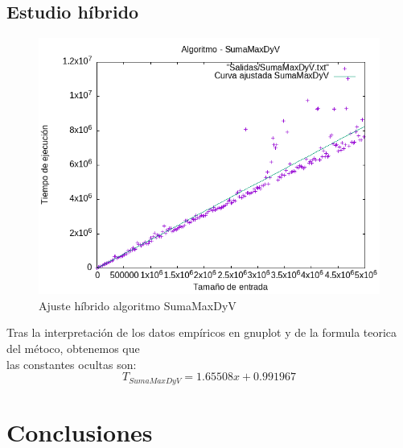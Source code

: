 \documentclass[11pt,openany]{book}
\begin{document}
\section*{Estudio híbrido}
  \begin{figure}[h]
      \begin{minipage}{0.5\textwidth}
          \centering
          \includegraphics[width=\linewidth]{../Codigos/AjusteHibrido/SumaMaxDyV_hib.png}
          \caption{Ajuste híbrido algoritmo SumaMaxDyV}
          \label{fig:mergesort}
      \end{minipage}
  \end{figure}
  Tras la interpretación de los datos empíricos en gnuplot y de la formula teorica del métoco, obtenemos que \\
  las constantes ocultas son:
  \begin{equation*}
      T_{SumaMaxDyV}=1.65508x + 0.991967
  \end{equation*}
  


\chapter{Conclusiones}
\end{document}
